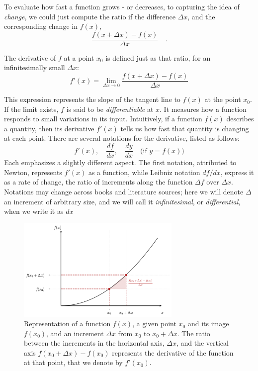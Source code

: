 \documentclass{book}
\begin{document}
To evaluate how fast a function grows - or decreases, to capturing the idea of \emph{change}, we could just compute the ratio if the difference $\Delta x$, and the corresponding change in $f(x)$, 
\begin{equation}
	\frac{f(x + \Delta x) - f(x)}{\Delta x} \quad.
\end{equation}

The derivative of \( f \) at a point \( x_0 \) is defined just as that ratio, for an infinitesimally small $\Delta x$:
\begin{equation}
	f'(x) = \lim_{\Delta x \to 0} \frac{f(x + \Delta x) - f(x)}{\Delta x}
\end{equation}

This expression represents the slope of the tangent line to \( f(x) \) at the point \( x_0 \). If the limit exists, \( f \) is said to be \emph{differentiable} at \( x \). It measures how a function responds to small variations in its input. Intuitively, if a function \( f(x) \) describes a quantity, then its derivative \( f'(x) \) tells us how fast that quantity is changing at each point. There are several notations for the derivative, listed as follows:
\[
f'(x), \quad \frac{df}{dx}, \quad \frac{dy}{dx} \quad \text{(if } y = f(x) \text{)}
\]
Each emphasizes a slightly different aspect. The first notation, attributed to Newton, represents $f'(x)$ as a function, while Leibniz notation $df / dx$, express it as a rate of change, the ratio of increments along the function $\Delta f$ over $\Delta x$. Notations may change across books and literature sources; here we will denote $\Delta$ an increment of arbitrary size, and we will call it \textit{infinitesimal}, or \textit{differential}, when we write it as $dx$

\begin{figure}[ht]
    \centering
    \includegraphics[width=0.7\textwidth]{figures/appendix/functions_point_2_shadow.png}
    \caption{Representation of a function $f(x)$, a given point $x_0$ and its image $f(x_0)$, and an increment $\Delta x$ from $x_0$ to $x_0 + \Delta x$. The ratio between the increments in the horizontal axis, $\Delta x$, and the vertical axis $f(x_0 + \Delta x) - f(x_0)$ represents the derivative of the function at that point, that we denote by $f'(x_0)$.}
    \label{fig:functions_point_2_shadow}
\end{figure}
\end{document}
